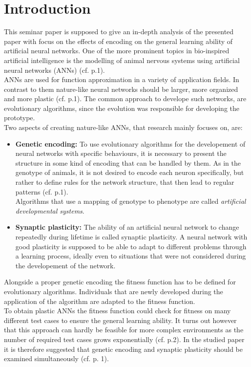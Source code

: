 \documentclass[12pt,twoside]{article}
\theoremstyle{plain}
\theoremstyle{definition}
\theoremstyle{remark}
\begin{document}
\section{Introduction}
\label{sec:introduction}
This seminar paper is supposed to give an in-depth analysis of the presented paper \cite{citeulike:12788284} with focus on the effects of encoding on the general learning ability of artificial neural networks.\medskip
One of the more prominent topics in bio-inspired artificial intelligence is the modelling of animal nervous systems using artificial neural networks (ANNs) (cf. \cite{citeulike:12788284} p.1).\\
ANNs are used for function approximation in a variety of application fields.
In contrast to them nature-like neural networks should be larger, more organized and more plastic (cf. \cite{citeulike:12788284} p.1). 
The common approach to develope such networks, are evolutionary algorithms, since the evolution was responsible for developing the prototype.\\
Two aspects of creating nature-like ANNs, that research mainly focuses on, are:
\begin{itemize}
	\item \textbf{Genetic encoding:} To use evolutionary algorithms for the developement of neural networks with specific behaviours, it is necessary to present the structure in some kind of encoding that can be handled by them.
	As in the genotype of animals, it is not desired to encode each neuron specifically, but rather to define rules for the network structure, that then lead to regular patterns (cf. \cite{citeulike:12788284} p.1).\\
	Algorithms that use a mapping of genotype to phenotype are called \textit{artificial developmental systems}.
	\item \textbf{Synaptic plasticity:} The ability of an artificial neural network to change repeatedly during lifetime is called synaptic plasticity.
	A neural network with good plasticity is supposed to be able to adapt to different problems through a learning process, ideally even to situations that were not considered during the developement of the network.
\end{itemize}
Alongside a proper genetic encoding the fitness function has to be defined for evolutionary algorithms. Individuals that are newly developed during the application of the algorithm are adapted to the fitness function. \\
To obtain plastic ANNs the fitness function could check for fitness on many different test cases to ensure the general learning ability.
It turns out however that this approach can hardly be feasible for more complex environments as the number of required test cases grows exponentially (cf. \cite{citeulike:12788284} p.2).\medskip
In the studied paper \cite{citeulike:12788284} it is therefore suggested that genetic encoding and synaptic plasticity should be examined simultaneously (cf. \cite{citeulike:12788284} p. 1).\\
\end{document}
